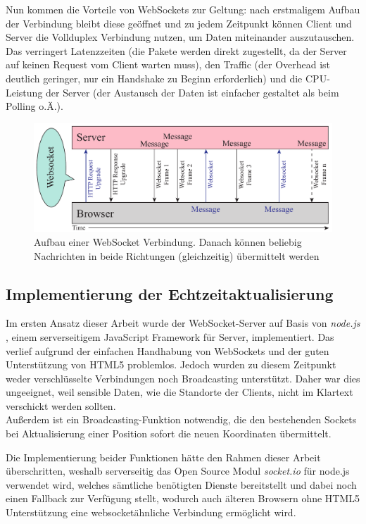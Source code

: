 Nun kommen die Vorteile von WebSockets zur Geltung: nach erstmaligem Aufbau der Verbindung bleibt diese geöffnet und zu jedem Zeitpunkt können Client und Server die Vollduplex Verbindung nutzen, um Daten miteinander auszutauschen. Das verringert Latenzzeiten (die Pakete werden direkt zugestellt, da der Server auf keinen Request vom Client warten muss), den Traffic (der Overhead ist deutlich geringer, nur ein Handshake zu Beginn erforderlich) und die CPU-Leistung der Server (der Austausch der Daten ist einfacher gestaltet als beim Polling o.Ä.).

\begin{figure}[!ht]
	\centering
	\includegraphics[width=15cm]{fig/websockets}
	\caption{Aufbau einer WebSocket Verbindung. Danach können beliebig Nachrichten in beide Richtungen (gleichzeitig) übermittelt werden}
\end{figure}

\subsection{Implementierung der Echtzeitaktualisierung}
Im ersten Ansatz dieser Arbeit wurde der WebSocket-Server auf Basis von \emph{node.js} \cite{node.js}, einem serverseitigem JavaScript Framework für Server, implementiert. Das verlief aufgrund der einfachen Handhabung von WebSockets und der guten Unterstützung von HTML5 problemlos. Jedoch wurden zu diesem Zeitpunkt weder verschlüsselte Verbindungen noch Broadcasting unterstützt. Daher war dies ungeeignet, weil sensible Daten, wie die Standorte der Clients, nicht im Klartext verschickt werden sollten.\\
Außerdem ist ein Broadcasting-Funktion notwendig, die den bestehenden Sockets bei Aktualisierung einer Position sofort die neuen Koordinaten übermittelt.\par

Die Implementierung beider Funktionen hätte den Rahmen dieser Arbeit überschritten, weshalb serverseitig das Open Source Modul \emph{socket.io} \cite{socket.io} für node.js verwendet wird, welches sämtliche benötigten Dienste bereitstellt und dabei noch einen Fallback zur Verfügung stellt, wodurch auch älteren Browsern ohne HTML5 Unterstützung eine websocketähnliche Verbindung ermöglicht wird.\par

